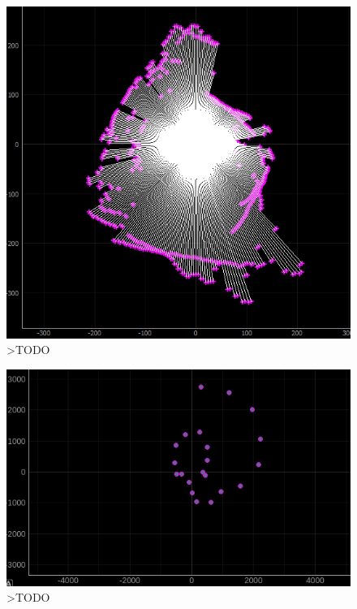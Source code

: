 \begin{figure}[ht]
	\centering
		\includegraphics[width=0.5\linewidth]{rys/ScanBot-12-calibrated-room-map4.PNG}
	\caption{>TODO}
	\label{fig:xxx}
\end{figure}






\begin{figure}[ht]
	\centering
		\includegraphics[width=0.8\linewidth]{rys/calibrated-mag-high-interference-broken-rotation.PNG}
	\caption{>TODO}
	\label{fig:xxx}
\end{figure}

